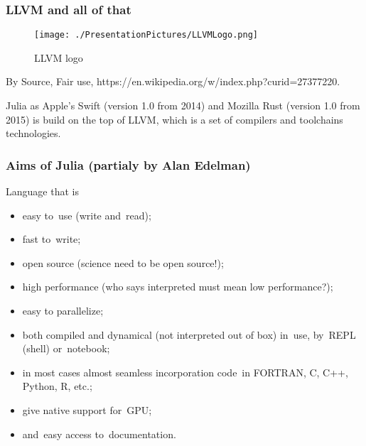 \documentclass[10pt,t]{beamer}
\begin{document}
\begin{frame}
  \frametitle{LLVM and all of that}


  \begin{figure}

    \texttt{[image: ./PresentationPictures/LLVMLogo.png]}

    \caption{LLVM logo}

  \end{figure}


  By Source, Fair use,
  {https://en.wikipedia.org/w/index.php?curid=27377220}.


  Julia as Apple's Swift (version 1.0 from 2014) and Mozilla Rust
  (version 1.0 from 2015) is build on the top of LLVM, which is a set
  of compilers and toolchains technologies.

\end{frame}





\begin{frame}
  \frametitle{Aims of Julia (partialy by Alan Edelman)}


  Language that is
  \begin{itemize}

  \item easy to~use (write and~read);

  \item fast to~write;

  \item open source (science need to be open source!);

  \item high performance (who says interpreted must mean low
    performance?);

  \item easy to parallelize;

  \item both compiled and dynamical (not interpreted out of box)
    in~use, by~REPL (shell) or~notebook;

  \item in most cases almost seamless incorporation code~in FORTRAN,
    C, C++, Python, R, etc.;

  \item give native support for~GPU;

  \item and~easy access to~documentation.

  \end{itemize}

\end{frame}
\end{document}
